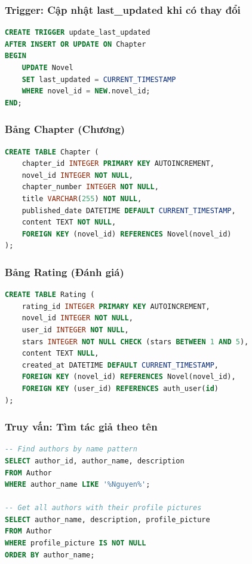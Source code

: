 \documentclass[12pt,aspectratio=169,handout]{beamer}
\begin{document}
\begin{frame}[fragile]
\frametitle{Trigger: Cập nhật last\_updated khi có thay đổi}
\begin{lstlisting}[language=SQL, basicstyle=\small\ttfamily]
CREATE TRIGGER update_last_updated
AFTER INSERT OR UPDATE ON Chapter
BEGIN
    UPDATE Novel
    SET last_updated = CURRENT_TIMESTAMP
    WHERE novel_id = NEW.novel_id;
END;
\end{lstlisting}
\end{frame}

\begin{frame}[fragile]
\frametitle{Bảng Chapter (Chương)}
\begin{lstlisting}[language=SQL, basicstyle=\small\ttfamily]
CREATE TABLE Chapter (
    chapter_id INTEGER PRIMARY KEY AUTOINCREMENT,
    novel_id INTEGER NOT NULL,
    chapter_number INTEGER NOT NULL,
    title VARCHAR(255) NOT NULL,
    published_date DATETIME DEFAULT CURRENT_TIMESTAMP,
    content TEXT NOT NULL,
    FOREIGN KEY (novel_id) REFERENCES Novel(novel_id)
);
\end{lstlisting}
\end{frame}

\begin{frame}[fragile]
\frametitle{Bảng Rating (Đánh giá)}
\begin{lstlisting}[language=SQL, basicstyle=\small\ttfamily]
CREATE TABLE Rating (
    rating_id INTEGER PRIMARY KEY AUTOINCREMENT,
    novel_id INTEGER NOT NULL,
    user_id INTEGER NOT NULL,
    stars INTEGER NOT NULL CHECK (stars BETWEEN 1 AND 5),
    content TEXT NULL,
    created_at DATETIME DEFAULT CURRENT_TIMESTAMP,
    FOREIGN KEY (novel_id) REFERENCES Novel(novel_id),
    FOREIGN KEY (user_id) REFERENCES auth_user(id)
);
\end{lstlisting}
\end{frame}

\begin{frame}[fragile]
\frametitle{Truy vấn: Tìm tác giả theo tên}
\begin{lstlisting}[language=SQL, basicstyle=\small\ttfamily]
-- Find authors by name pattern
SELECT author_id, author_name, description 
FROM Author 
WHERE author_name LIKE '%Nguyen%';

-- Get all authors with their profile pictures
SELECT author_name, description, profile_picture
FROM Author 
WHERE profile_picture IS NOT NULL
ORDER BY author_name;
\end{lstlisting}
\end{frame}
\end{document}

